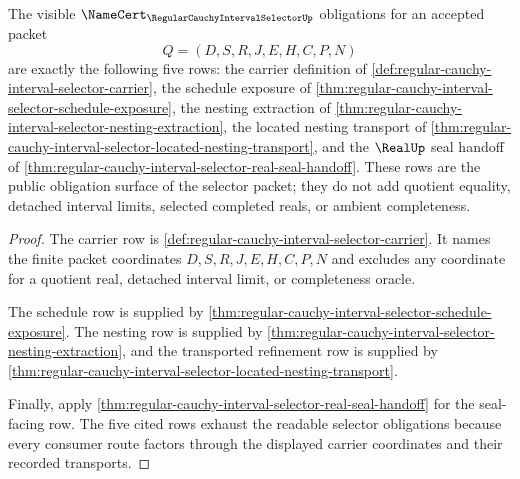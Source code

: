 \begin{theorem}
\label{thm:regular-cauchy-interval-selector-obligation-surface}
The visible $\NameCert_{\RegularCauchyIntervalSelectorUp}$ obligations for an accepted packet
$$
Q=(D,S,R,J,E,H,C,P,N)
$$
are exactly the following five rows: the carrier definition of \autoref{def:regular-cauchy-interval-selector-carrier}, the schedule exposure of \autoref{thm:regular-cauchy-interval-selector-schedule-exposure}, the nesting extraction of \autoref{thm:regular-cauchy-interval-selector-nesting-extraction}, the located nesting transport of \autoref{thm:regular-cauchy-interval-selector-located-nesting-transport}, and the $\RealUp$ seal handoff of \autoref{thm:regular-cauchy-interval-selector-real-seal-handoff}. These rows are the public obligation surface of the selector packet; they do not add quotient equality, detached interval limits, selected completed reals, or ambient completeness.
\end{theorem}
\begin{proof}
The carrier row is \autoref{def:regular-cauchy-interval-selector-carrier}. It names the finite packet coordinates $D,S,R,J,E,H,C,P,N$ and excludes any coordinate for a quotient real, detached interval limit, or completeness oracle.

The schedule row is supplied by \autoref{thm:regular-cauchy-interval-selector-schedule-exposure}. The nesting row is supplied by \autoref{thm:regular-cauchy-interval-selector-nesting-extraction}, and the transported refinement row is supplied by \autoref{thm:regular-cauchy-interval-selector-located-nesting-transport}.

Finally, apply \autoref{thm:regular-cauchy-interval-selector-real-seal-handoff} for the seal-facing row. The five cited rows exhaust the readable selector obligations because every consumer route factors through the displayed carrier coordinates and their recorded transports.
\end{proof}

